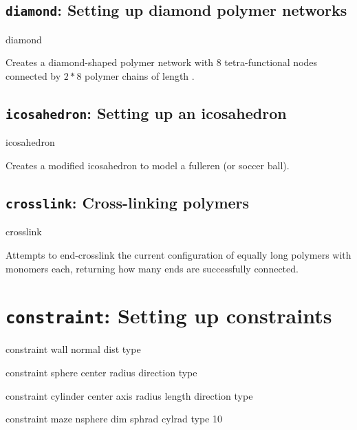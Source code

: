 \subsection{\texttt{diamond}: Setting up diamond polymer networks}
\begin{essyntax}
  diamond 
     
\end{essyntax}
Creates a diamond-shaped polymer network with 8 tetra-functional nodes
connected by $2*8$ polymer chains of length .

\subsection{\texttt{icosahedron}: Setting up an icosahedron}
\begin{essyntax}
  icosahedron 
    
\end{essyntax}
Creates a modified icosahedron to model a fulleren (or soccer ball).

\subsection{\texttt{crosslink}: Cross-linking polymers}
\begin{essyntax}
  crosslink 
    
\end{essyntax}
Attempts to end-crosslink the current configuration of 
equally long polymers with  monomers each, returning how many
ends are successfully connected. 

\section{\texttt{constraint}: Setting up constraints}

\begin{essyntax}
  constraint wall normal    
  dist  type 

  constraint sphere center    
  radius  direction  type  
  
  constraint cylinder center    
  axis    
  radius  length  
  direction  
  type  
  
  constraint maze nsphere  
  dim  sphrad  cylrad 
  type 10  
\end{essyntax}

